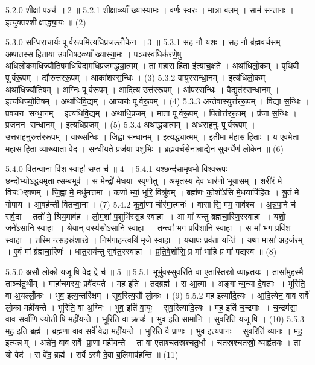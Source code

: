 5.2.0
शीक्षां पञ्च॑ ॥ 2 ॥
5.2.1
शीक्षाव्व्याँख्यास्या॒मः । वर्णः॒ स्वरः । मात्रा॒ बलम् । साम॑ सन्ता॒नः । इत्युक्तश्शीक्षाद्ध्या॒यः ॥ (2)
\anuvakamend

5.3.0
स॒न्धिराचार्यः पूर्वरू॒पमित्यधि॒प्रजल्लोँ॑के॒न ॥ 3 ॥
5.3.1
स॒ह नौ॒ यशः । स॒ह नौ ब्र॑ह्मव॒र्चसम् । अथातस्सहिताया उपनिषदव्व्याँख्यास्या॒मः । पञ्चस्वधिक॑रणे॒षु । अधिलोकमधिज्यौतिषमधिविद्यमधिप्रज॑मद्ध्या॒त्मम् । ता महासहिता इ॑त्याच॒क्षते । अथा॑धिलो॒कम् । पृथिवी पूर्वरू॒पम् । द्यौरुत्त॑ररू॒पम् । आका॑शस्स॒न्धिः । (3)
5.3.2
वायु॑स्सन्धा॒नम् । इत्य॑धिलो॒कम् । अथा॑धिज्यौ॒तिषम् । अग्निः पूर्वरू॒पम् । आदित्य उत्त॑ररू॒पम् । आ॑पस्स॒न्धिः । वैद्युत॑स्सन्धा॒नम् । इत्य॑धिज्यौ॒तिषम् । अथा॑धिवि॒द्यम् । आचार्यः पूर्वरू॒पम् । (4)
5.3.3
अन्तेवास्युत्त॑ररू॒पम् । वि॑द्या स॒न्धिः । प्रवचन सन्धा॒नम् । इत्य॑धिवि॒द्यम् । अथाधि॒प्रजम् । माता पूर्वरू॒पम् । पितोत्त॑ररू॒पम् । प्र॑जा स॒न्धिः । प्रजनन सन्धा॒नम् । इत्यधि॒प्रजम् । (5)
5.3.4
अथाद्ध्या॒त्मम् । अधराहनुः पूर्वरू॒पम् । उत्तराहनुरुत्त॑ररू॒पम् । वाख्स॒न्धिः । जिह्वा॑ सन्धा॒नम् । इत्यद्ध्या॒त्मम् । इतीमा म॑हास॒हिताः । य एवमेता महासहिता व्याख्या॑ता वे॒द । सन्धीयते प्रज॑या प॒शुभिः । ब्रह्मवर्चसेनान्नाद्येन सुवर्ग्येण॑ लोके॒न ॥ (6)
\anuvakamend

5.4.0
वि॒त॒न्वा॒ना वि॑श॒ स्वाहा॑ स॒प्त च॑ ॥ 4 ॥
5.4.1
यश्छन्द॑सामृष॒भो वि॒श्वरू॑पः । छन्दो॒भ्योऽद्ध्य॒मृतात्सम्ब॒भूव॑ । स मेन्द्रो॑ मे॒धया स्पृणोतु । अ॒मृत॑स्य देव॒ धार॑णो भूयासम् । शरी॑रं मे॒ विच॑र््षणम् । जि॒ह्वा मे॒ मधु॑मत्तमा । कर्णाभ्यां॒ भूरि॒ विश्रु॑वम् । ब्रह्म॑णः को॒शो॑ऽसि मे॒धयापि॑हितः । श्रु॒तं मे॑ गोपाय । आ॒वह॑न्ती वितन्वा॒ना । (7)
5.4.2
कु॒र्वा॒णा चीर॑मा॒त्मनः॑ । वासासि॒ मम॒ गाव॑श्च । अ॒न्न॒पा॒ने च॑ सर्व॒दा । ततो॑ मे॒ श्रिय॒माव॑ह । लो॒म॒शां प॒शुभि॑स्स॒ह स्वाहा । आ मा॑ यन्तु ब्रह्मचा॒रिण॒स्स्वाहा । यशो॒ जने॑ऽसानि॒ स्वाहा । श्रेया॒न्॒ वस्य॑सोऽसानि॒ स्वाहा । तन्त्वा॑ भग॒ प्रवि॑शानि॒ स्वाहा । स मा॑ भग॒ प्रवि॑श॒ स्वाहा । तस्मिन्त्स॒हस्र॑शाखे । निभ॑गा॒हन्त्वयि॑ मृजे॒ स्वाहा । यथापः॒ प्रव॑ता॒ यन्ति॑ । यथा॒ मासा॑ अहर्ज॒रम् । ए॒वं मां ब्र॑ह्मचा॒रिणः॑ । धात॒राय॑न्तु स॒र्वत॒स्स्वाहा । प्र॒ति॒वे॒शो॑सि॒ प्र मा॑ भाहि॒ प्र मा॑ पद्यस्व ॥ (8)
\anuvakamend

5.5.0
अ॒सौ लो॒को यजूषि॒ वेद॒ द्वे च॑ ॥ 5 ॥
5.5.1
भूर्भुव॒स्सुव॒रिति॒ वा ए॒तास्ति॒स्रो व्याहृ॑तयः । तासा॑मुहस्मै॒ ताञ्च॑तु॒र्थीम् । माहा॑चमस्यः॒ प्रवे॑दयते । मह॒ इति॑ । तद्ब्रह्म॑ । स आ॒त्मा । अङ्गान्य॒न्या दे॒वताः । भूरिति॒ वा अ॒यल्लोँ॒कः । भुव॒ इत्य॒न्तरि॑क्षम् । सुव॒रित्य॒सौ लो॒कः । (9)
5.5.2
मह॒ इत्या॑दि॒त्यः । आ॒दि॒त्येन॒ वाव सर्वे॑ लो॒का मही॑यन्ते । भूरिति॒ वा अ॒ग्निः । भुव॒ इति॑ वा॒युः । सुव॒रित्या॑दि॒त्यः । मह॒ इति॑ च॒न्द्रमाः । च॒न्द्रम॑सा॒ वाव सर्वा॑णि॒ ज्योतीषि॒ मही॑यन्ते । भूरिति॒ वा ऋचः॑ । भुव॒ इति॒ सामा॑नि । सुव॒रिति॒ यजूषि । (10)
5.5.3
मह॒ इति॒ ब्रह्म॑ । ब्रह्म॑णा॒ वाव सर्वे॑ वे॒दा मही॑यन्ते । भूरिति॒ वै प्रा॒णः । भुव॒ इत्य॑पा॒नः । सुव॒रिति॑ व्या॒नः । मह॒ इत्यन्नम् । अन्ने॑न॒ वाव सर्वे प्रा॒णा मही॑यन्ते । ता वा ए॒ताश्च॑तस्रश्चतु॒र्धा । चत॑स्रश्चतस्रो॒ व्याहृ॑तयः । ता यो वेद॑ । स वे॑द॒ ब्रह्म॑ । सर्वेऽस्मै दे॒वा ब॒लिमाव॑हन्ति ॥ (11)
\anuvakamend

